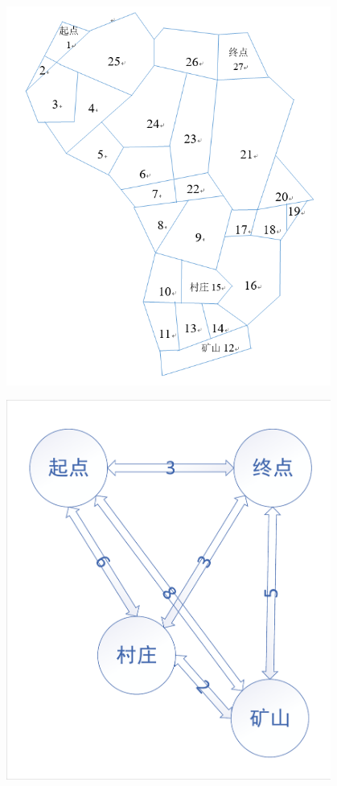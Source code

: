 \documentclass[withoutpreface,bwprint]{cumcmthesis} %
\begin{document}
\begin{figure}
    \centering
    \begin{minipage}[c]{0.45\textwidth}
        \centering
        \includegraphics[width=0.95\textwidth]{figures/dt.png}
        \label{dt}
    \end{minipage}
    \begin{minipage}[c]{0.45\textwidth}
        \centering
        \includegraphics[width=0.95\textwidth]{figures/jianhua.pdf}

\end{minipage}
\end{figure}
\end{document}
